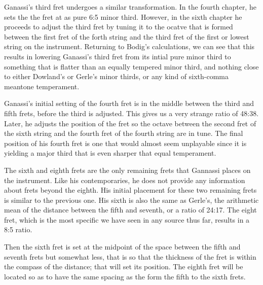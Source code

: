 

Ganassi's third fret undergoes a similar transformation.  In the fourth chapter, he sets the
the fret at as pure 6:5 minor third.  However, in the sixth chapter he proceeds to adjust the third fret
by tuning it to the ocatve that is formed between the first fret of the forth string and the
third fret of the first or lowest string on the instrument.  Returning to Bodig's calculations,
we can see that this results in lowering Ganassi's third fret from its intial pure minor third
to something that is flatter than an equally tempered minor third, and nothing close to either
Dowland's or Gerle's minor thirds, or any kind of sixth-comma meantone temperament.



Ganassi's initial setting of the fourth fret is in the middle between the third and
fifth frets, before the third is adjusted.  This gives us a very strange ratio of 48:38.  Later,
he adjusts the position of the
fret so the octave between the second fret of the sixth string and the fourth fret of the
fourth string are in tune.  The final position of his fourth fret is one that would almost
seem unplayable since it is yielding a major third that is even sharper that equal temperament.



The sixth and eighth frets are the only remaining frets that Gannassi places on the instrument.
Like his contemporaries, he does not provide any information about frets beyond the eighth.
His initial placement for these two remaining frets is similar to the previous one.  His
sixth is also the same as Gerle's, the arithmetic mean of the distance between the fifth
and seventh, or a ratio of 24:17.  The eight fret, which is the most
specific we have seen in any source thus far, results in a 8:5 ratio.

\begin{blocks}
Then the sixth fret is set at the midpoint of the space
between the fifth and seventh frets but somewhat less, that is so that the
thickness of the fret is within the compass of the distance; that will set its
position.  The eighth fret will be located so as to have the same spacing as the
form the fifth to the sixth frets.
\end{blocks}

